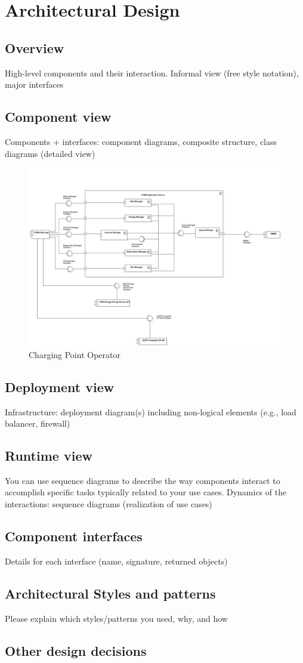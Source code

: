 \section{Architectural Design}
\subsection{Overview}
High-level components and their interaction. Informal view (free style notation), major
interfaces

\subsection{Component view}
Components + interfaces: component diagrams, composite structure, class diagrams (detailed view)
\begin{figure}[H]
    \centering
    \includegraphics[scale=0.38]{src/ComponentDiagram/CPOdiagram.png}
    \caption{Charging Point Operator}
\end{figure} \vspace{1cm}

\subsection{Deployment view}
Infrastructure: deployment diagram(s) including non-logical elements (e.g., load balancer, firewall)
\subsection{Runtime view}
You can use sequence diagrams to describe the way components interact to accomplish specific tasks typically related to your use cases. Dynamics of the interactions: sequence
diagrams (realization of use cases)
\subsection{Component interfaces}
Details for each interface (name, signature, returned objects)
\subsection{Architectural Styles and patterns}
Please explain which styles/patterns you used, why, and how
\subsection{Other design decisions}